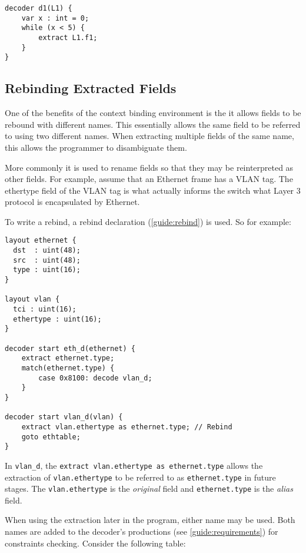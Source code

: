 \begin{minip}
\begin{lstlisting}
decoder d1(L1) {
	var x : int = 0; 	
	while (x < 5) {
		extract L1.f1;
	}
}
\end{lstlisting}
\end{minip}

\subsection{Rebinding Extracted Fields}

One of the benefits of the context binding environment is the it
allows fields to be rebound with different names. This essentially
allows the same field to be referred to using two different names.
When extracting multiple fields of the same name, this allows the
programmer to disambiguate them. 

More commonly it is used to rename fields so that they may be reinterpreted as other fields. For example, assume that an Ethernet
frame has a VLAN tag. The ethertype field of the VLAN tag is what 
actually informs the switch what Layer 3 protocol is encapsulated
by Ethernet. 

To write a rebind, a rebind declaration (\ref{guide:rebind}) is used.
So for example:

\begin{codepage}
\begin{lstlisting}
layout ethernet {
  dst  : uint(48);
  src  : uint(48);
  type : uint(16);
}

layout vlan {
  tci : uint(16);
  ethertype : uint(16);
}

decoder start eth_d(ethernet) {
	extract ethernet.type;
	match(ethernet.type) {
		case 0x8100: decode vlan_d;
	}
}

decoder start vlan_d(vlan) {
	extract vlan.ethertype as ethernet.type; // Rebind
	goto ethtable;
}
\end{lstlisting}
\end{codepage}

In \texttt{vlan\_d}, the \texttt{extract vlan.ethertype as ethernet.type} allows the extraction of \texttt{vlan.ethertype} to be referred to as
\texttt{ethernet.type} in future stages. The \texttt{vlan.ethertype}
is the \emph{original} field and \texttt{ethernet.type} is the \emph{alias} field.

When using the extraction later in the program, either name may be used.  
Both names are added to the decoder's productions (see \ref{guide:requirements}) for constraints checking. 
Consider the following table:

